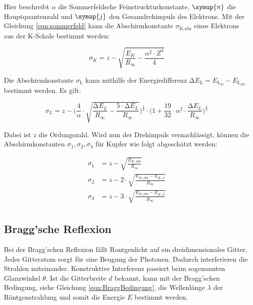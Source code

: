 Hier beschreibt $\alpha$ die Sommerfeldsche Feinstruckturkonstante, $\symup{n}$ die Hauptquantenzahl und $\symup{j}$ den Gesamdrehimpuls des Elektrons.
Mit der Gleichung \eqref{eqn:sommerfeld} kann die Abschirmkonstante $\sigma_\text{K,abs}$ eines Elektrons aus der K-Schale bestimmt werden:

\begin{equation}
    \sigma_K = z - \sqrt{\frac{E_K}{R_\infty} - \frac{\alpha^2 \cdot Z^4}{4}}
\end{equation}

Die Abschirmkonstante $\sigma_\text{L}$ kann mithilfe der Energiedifferenz $\increment E_\text{L} = E_\text{L}_{II} -E_\text{L}_{III}$ bestimmt werden.
Es gilt:

\begin{equation}
    \sigma_L = z -\Biggl( \frac{4}{\alpha} \cdot \sqrt{\frac{\increment E_L}{R_\infty} - \frac{5 \cdot \increment E_L}{R_\infty}} \Biggr)^{\frac{1}{2}}
                \cdot \Biggl(1 + \frac{19}{32} \cdot \alpha^2 \cdot \frac{\increment E_L}{R_\infty} \Biggr)^{\frac{1}{2}}
\end{equation}

Dabei ist $z$ die Ordungszahl.
Wird nun der Drehimpuls vernachlässigt, können die Abschirmkonstanten $\sigma_1, \sigma_2, \sigma_3$ für Kupfer wie folgt abgeschätzt werden:

\begin{align}
    \sigma_1 &= z - \sqrt{\frac{E_{K,\text{abs}}}{R_\infty}} \label{eq:sigma1} \\
    \sigma_2 &= z - 2 \cdot \sqrt{\frac{E_{K,\text{abs}} - E_{K, \alpha}}{R_\infty}} \label{eq:sigma2} \\
    \sigma_3 &= z - 3 \cdot \sqrt{\frac{E_{K,\text{abs}} - E_{K, \beta}}{R_\infty}} \label{eq:sigma3} \\
\end{align}

\subsection{Bragg'sche Reflexion}
\label{subsec:Bragg}

Bei der Bragg'schen Reflexion fällt Rontgenlicht auf ein dreidimensionales Gitter.
Jedes Gitteratom sorgt für eine Beugung der Photonen.
Dadurch interferieren die Strahlen miteinander.
Konstruktive Interferenz passiert beim sogenannten Glanzwinkel $\theta$.
Ist die Gitterbreite $d$ bekannt, kann mit der Bragg'schen Bedingung, siehe Gleichung \eqref{eqn:BraggBedingung},
die Wellenlänge $\lambda$ der Röntgenstrahlung und somit die Energie $E$ bestimmt werden.


